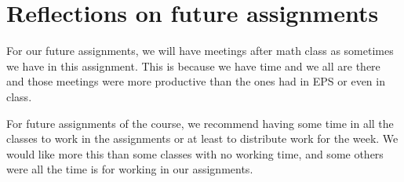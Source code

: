 \documentclass{article}
\begin{document}
\section{Reflections on future assignments}

For our future assignments, we will have meetings after math class as sometimes we have in this assignment. This is because we have time and we all are there and those meetings were more productive than the ones had in EPS or even in class.

For future assignments of the course, we recommend having some time in all the classes to work in the assignments or at least to distribute work for the week. We would like more this than some classes with no working time, and some others were all the time is for working in our assignments.
\end{document}

